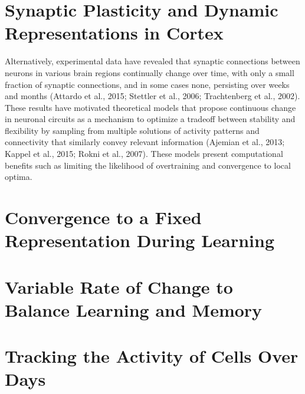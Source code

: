 \section{Synaptic Plasticity and Dynamic Representations in Cortex} \label{intro:plasticity/dynamic rep}
Alternatively, experimental data have revealed that synaptic connections between neurons in various brain regions continually change over time, with only a small fraction of synaptic connections, and in some cases none, persisting over weeks and months (Attardo et al., 2015; Stettler et al., 2006; Trachtenberg et al., 2002). These results have motivated theoretical models that propose continuous change in neuronal circuits as a mechanism to optimize a tradeoff between stability and flexibility by sampling from multiple solutions of activity patterns and connectivity that similarly convey relevant information (Ajemian et al., 2013; Kappel et al., 2015; Rokni et al., 2007). These models present computational benefits such as limiting the likelihood of overtraining and convergence to local optima.
 
\section{Convergence to a Fixed Representation During Learning} \label{intro:convergence during learning}

\section{Variable Rate of Change to Balance Learning and Memory} \label{intro:learning and memory}

\section{Tracking the Activity of Cells Over Days} \label{intro:track cells}

